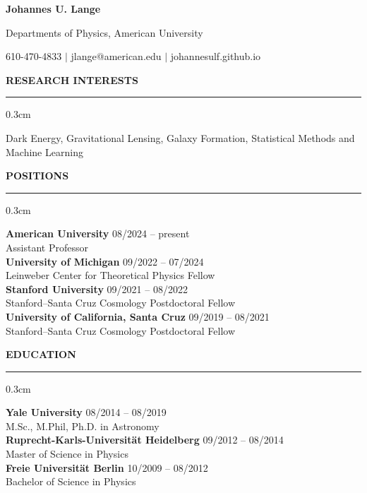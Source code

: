 \documentclass[12pt]{article}
\renewenvironment{section}[1]
  {
  \medskip
  {\color{aublue} \MakeUppercase{\bf #1}}
  \smallskip
  \hrule
  \medskip
  \begin{adjustwidth}{0.3cm}{}
  }
  {
  \end{adjustwidth}
  }
\newcommand{\entry}[3]{{\bf #1} \hfill {#2} \\ {#3}}
\begin{document}
\centerline{\color{aublue} \Huge \bf Johannes U. Lange}
\centerline{Departments of Physics, American University}
\centerline{610-470-4833 $\vert$ jlange@american.edu $\vert$ johannesulf.github.io}
\bigskip

\begin{section}{Research Interests}
  Dark Energy, Gravitational Lensing, Galaxy Formation, Statistical Methods and Machine Learning
\end{section}

\begin{section}{Positions}
  \entry{American University}{08/2024 -- present}{Assistant Professor} \\
  \entry{University of Michigan}{09/2022 -- 07/2024}{Leinweber Center for Theoretical Physics Fellow} \\
  \entry{Stanford University}{09/2021 -- 08/2022}{Stanford--Santa Cruz Cosmology Postdoctoral Fellow} \\
  \entry{University of California, Santa Cruz}{09/2019 -- 08/2021}{Stanford--Santa Cruz Cosmology Postdoctoral Fellow}
\end{section}

\begin{section}{Education}
  \entry{Yale University}{08/2014 -- 08/2019}{M.Sc., M.Phil, Ph.D. in Astronomy} \\
  \entry{Ruprecht-Karls-Universität Heidelberg}{09/2012 -- 08/2014}{Master of Science in Physics} \\
  \entry{Freie Universität Berlin}{10/2009 -- 08/2012}{Bachelor of Science in Physics}
\end{section}
\end{document}
